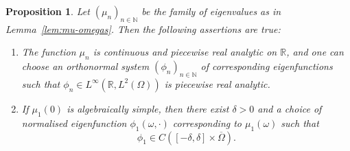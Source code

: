 \documentclass[a4paper, reqno,titlepage]{amsart}
\numberwithin{equation}{section}
\theoremstyle{plain}
\newtheorem{proposition}[theorem]{Proposition}
\theoremstyle{definition}
\theoremstyle{remark}
\newcommand{\NN}{\mathbb{N}}
\newcommand{\RR}{\mathbb{R}}
\begin{document}
\begin{proposition}
  \label{prop:cont-phi-1}
  Let $(\mu_n)_{n\in\NN}$ be the family of eigenvalues as in Lemma~\ref{lem:mu-omegas}. Then the following assertions are true:
  \begin{enumerate}[\upshape (i)]
  \item The function $\mu_n$ is continuous and piecewise real analytic on $\RR$, and one can choose an orthonormal system $(\phi_n)_{n\in\NN}$ of corresponding eigenfunctions such that $\phi_n\in L^\infty(\RR, L^2(\Omega))$ is piecewise real analytic.
  \item If $\mu_1(0)$ is algebraically simple, then there exist $\delta>0$ and a choice of normalised eigenfunction $\phi_1(\omega,\cdot)$ corresponding to $\mu_1(\omega)$ such that
    \begin{equation*}
      \phi_1\in C([-\delta,\delta]\times\overline\Omega).
    \end{equation*}
  \end{enumerate}
\end{proposition}
\end{document}
